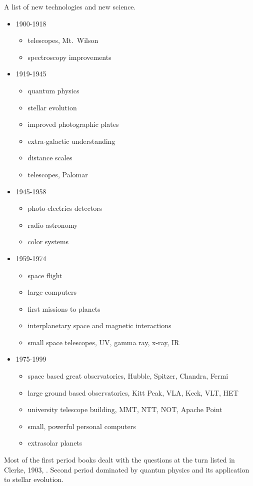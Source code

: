 A list of new technologies and new science.
\begin{itemize}
	\item 1900-1918
		\begin{itemize}
			\item telescopes, Mt.\ Wilson
			\item spectroscopy improvements
		\end{itemize}
	\item 1919-1945
		\begin{itemize}
			\item quantum physics
			\item stellar evolution
			\item improved photographic plates
			\item extra-galactic understanding
			\item distance scales
			\item telescopes, Palomar
		\end{itemize}
	\item 1945-1958
		\begin{itemize}
			\item photo-electrics detectors
			\item radio astronomy
			\item color systems
		\end{itemize}
	\item 1959-1974
		\begin{itemize}
			\item space flight
			\item large computers
			\item first missions to planets
			\item interplanetary space and magnetic interactions
			\item small space telescopes, UV, gamma ray, x-ray, IR
		\end{itemize}
	\item 1975-1999
		\begin{itemize}
			\item space based great observatories, Hubble, Spitzer, Chandra, Fermi
			\item large ground based observatories, Kitt Peak, VLA, Keck, VLT, HET
			\item university telescope building, MMT, NTT, NOT, Apache Point
			\item small, powerful personal computers
			\item extrasolar planets
		\end{itemize}
\end{itemize}

Most of the first period books dealt with the questions at the turn listed in Clerke, 1903,
\cite{clerke:1903}.  Second period dominated by quantun physics and its application to
stellar evolution.
